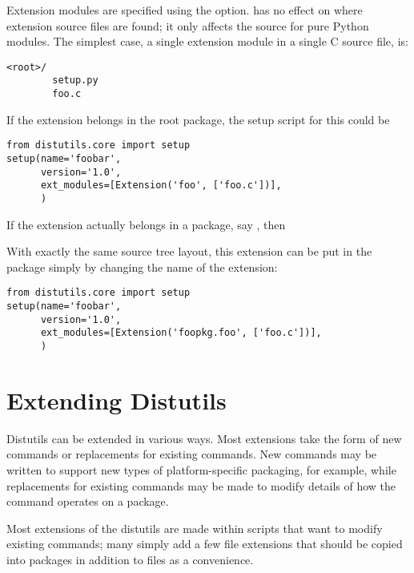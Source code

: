 \documentclass{manual}
\begin{document}
Extension modules are specified using the  option.
 has no effect on where extension source files are
found; it only affects the source for pure Python modules.  The simplest 
case, a single extension module in a single C source file, is:
\begin{verbatim}
<root>/
        setup.py
        foo.c
\end{verbatim}
If the  extension belongs in the root package, the setup
script for this could be
\begin{verbatim}
from distutils.core import setup
setup(name='foobar',
      version='1.0',
      ext_modules=[Extension('foo', ['foo.c'])],
      )
\end{verbatim}

If the extension actually belongs in a package, say ,
then 

With exactly the same source tree layout, this extension can be put in
the  package simply by changing the name of the
extension:
\begin{verbatim}
from distutils.core import setup
setup(name='foobar',
      version='1.0',
      ext_modules=[Extension('foopkg.foo', ['foo.c'])],
      )
\end{verbatim}






\chapter{Extending Distutils \label{extending}}

Distutils can be extended in various ways.  Most extensions take the
form of new commands or replacements for existing commands.  New
commands may be written to support new types of platform-specific
packaging, for example, while replacements for existing commands may
be made to modify details of how the command operates on a package.

Most extensions of the distutils are made within 
scripts that want to modify existing commands; many simply add a few
file extensions that should be copied into packages in addition to
 files as a convenience.
\end{document}
